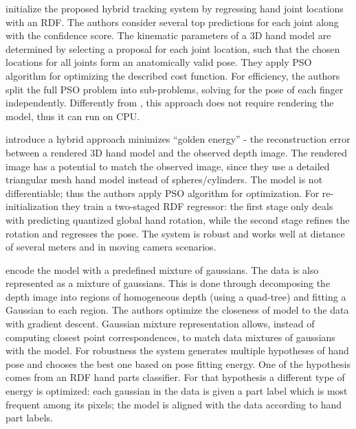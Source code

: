 \hspace{-0.4em}
\textbf{\cite{poier2015hybrid}}
initialize the proposed hybrid tracking system by regressing hand joint locations with an RDF. The authors consider several top predictions for each joint along with the confidence score. The kinematic parameters of a 3D hand model are determined by selecting a proposal for each joint location, such that the chosen locations for all joints form an anatomically valid pose. They apply PSO algorithm for optimizing the described cost function. For efficiency, the authors split the full PSO problem into sub-problems, solving for the pose of each finger independently. Differently from \cite{oiko2011hand}, this approach does not require rendering the model, thus it can run on CPU.

\hspace{-0.4em}
\textbf{\cite{sharp2015accurate}} 
introduce a hybrid approach minimizes “golden energy” - the reconstruction error between a rendered 3D hand model and the observed depth image. The rendered image has a potential to match the observed image, since they use a detailed triangular mesh hand model instead of spheres/cylinders. The model is not differentiable; thus the authors apply PSO algorithm for optimization. For re-initialization they train a two-staged RDF regressor: the first stage only deals with predicting quantized global hand rotation, while the second stage refines the rotation and regresses the pose. The system is robust and works well at distance of several meters and in moving camera scenarios.

\hspace{-0.4em}
\textbf{\cite{sridhar2015fast}} 
encode the model with a predefined mixture of gaussians. The data is also represented as a mixture of gaussians. This is done through decomposing the depth image into regions of homogeneous depth (using a quad-tree) and fitting a Gaussian to each region. The authors optimize the closeness of model to the data with gradient descent. Gaussian mixture representation allows, instead of computing closest point correspondences, to match data mixtures of gaussians with the model. For robustness the system generates multiple hypotheses of hand pose and chooses the best one based on pose fitting energy. One of the hypothesis comes from an RDF hand parts classifier. For that hypothesis a different type of energy is optimized: each gaussian in the data is given a part label which is most frequent among its pixels; the model is aligned with the data according to hand part labels.

